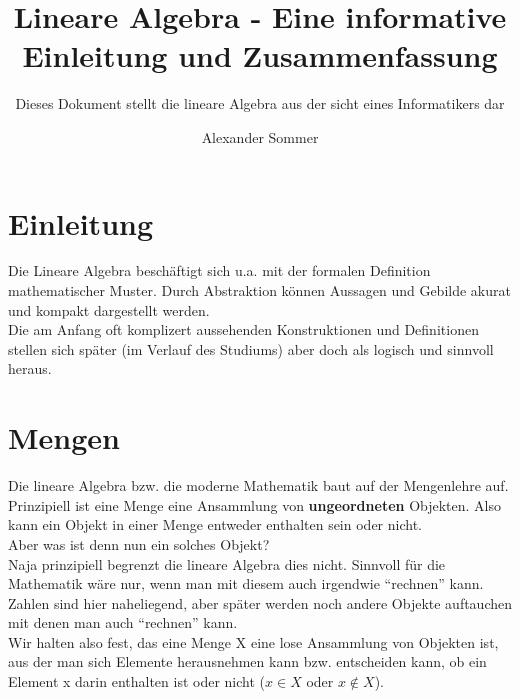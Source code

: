 \documentclass[parskip=full]{scrartcl}
\title{Lineare Algebra - Eine informative Einleitung und Zusammenfassung}
\subtitle{Dieses Dokument stellt die lineare Algebra aus der sicht eines Informatikers dar}
\author{Alexander Sommer}
\begin{document}
\maketitle

\section{Einleitung}
    Die Lineare Algebra beschäftigt sich u.a. mit der formalen Definition mathematischer Muster.
    Durch Abstraktion können Aussagen und Gebilde akurat und kompakt dargestellt werden.
    \\Die am Anfang oft komplizert aussehenden Konstruktionen und Definitionen stellen sich später
    (im Verlauf des Studiums) aber doch als logisch und sinnvoll heraus.

\section{Mengen}
    Die lineare Algebra bzw. die moderne Mathematik baut auf der Mengenlehre auf.
    Prinzipiell ist eine Menge eine Ansammlung von \textbf{ungeordneten} Objekten.
    Also kann ein Objekt in einer Menge entweder enthalten sein oder nicht.
    \\Aber was ist denn nun ein solches Objekt?
    \\Naja prinzipiell begrenzt die lineare Algebra dies nicht.
    Sinnvoll für die Mathematik wäre nur, wenn man mit diesem auch irgendwie \enquote{rechnen} kann. 
    Zahlen sind hier naheliegend, aber später werden noch andere Objekte auftauchen mit denen man auch \enquote{rechnen} kann.
    \\Wir halten also fest, das eine Menge X eine lose Ansammlung von Objekten ist, 
    aus der man sich Elemente herausnehmen kann bzw. entscheiden kann, ob ein Element x darin enthalten ist oder nicht (\(x \in X\) oder \(x\notin X\)).
    
\end{document}
